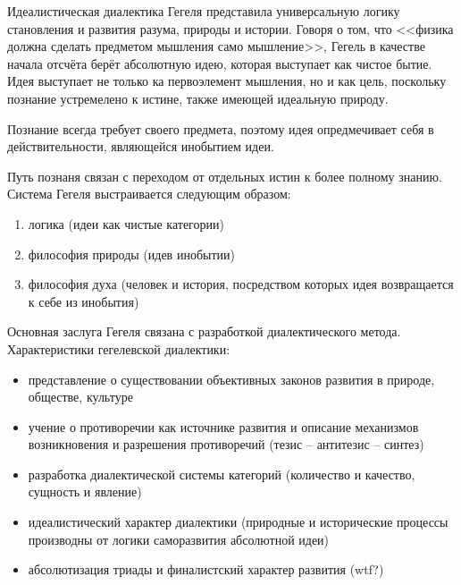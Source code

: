  Идеалистическая диалектика Гегеля представила универсальную логику становления и развития разума, природы и истории. Говоря о том, что <<физика должна сделать предметом мышления само мышление>>, Гегель в качестве начала отсчёта берёт абсолютную идею, которая выступает как чистое бытие. Идея выступает не только ка первоэлемент мышления, но и как цель, поскольку познание устремелено к истине, также имеющей идеальную природу.

 Познание всегда требует своего предмета, поэтому идея опредмечивает себя в действительности, являющейся инобытием идеи.

 Путь познаня связан с переходом от отдельных истин к более полному знанию. Система Гегеля выстраивается следующим образом:
 \begin{enumerate}
     \item логика (идеи как чистые категории)
     \item философия природы (идев инобытии)
     \item философия духа (человек и история, посредством которых идея возвращается к себе из инобытия)
 \end{enumerate}

 Основная заслуга Гегеля связана с разработкой диалектического метода. Характеристики гегелевской диалектики:
 \begin{itemize}
     \item представление о существовании объективных законов развития в природе, обществе, культуре
     \item учение о противоречии как источнике развития и описание механизмов возникновения и разрешения противоречий (тезис -- антитезис -- синтез)
     \item разработка диалектической системы категорий (количество и качество, сущность и явление)
     \item идеалистический характер диалектики (природные и исторические процессы производны от логики саморазвития абсолютной идеи)
     \item абсолютизация триады и финалистский характер развития (wtf?)
 \end{itemize}